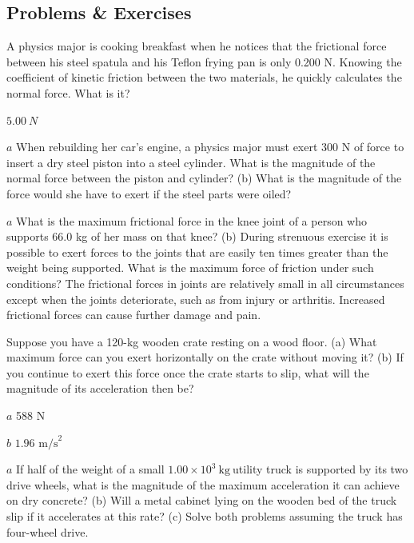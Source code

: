 \documentclass[
]{book}
\newenvironment{problems-exercises}{}{}
\begin{document}
\hypertarget{fs-id1288634}{}
\begin{problems-exercises}

\hypertarget{problems-exercises-10}{%
\subsection{Problems \& Exercises}\label{problems-exercises-10}}

\hypertarget{fs-id1462497}{}
\leavevmode\hypertarget{fs-id1462498}{}%
A physics major is cooking breakfast when he notices that the frictional
force between his steel spatula and his Teflon frying pan is only 0.200
N. Knowing the coefficient of kinetic friction between the two
materials, he quickly calculates the normal force. What is it?

\leavevmode\hypertarget{fs-id1319223}{}%
\(5.00\ N{}\)

\hypertarget{fs-id1534547}{}
\leavevmode\hypertarget{fs-id1319741}{}%
\(a\) When rebuilding her car's engine, a physics major must exert 300
N of force to insert a dry steel piston into a steel cylinder. What is
the magnitude of the normal force between the piston and cylinder? (b)
What is the magnitude of the force would she have to exert if the steel
parts were oiled?

\hypertarget{fs-id1250006}{}
\leavevmode\hypertarget{fs-id1250007}{}%
\(a\) What is the maximum frictional force in the knee joint of a person
who supports 66.0 kg of her mass on that knee? (b) During strenuous
exercise it is possible to exert forces to the joints that are easily
ten times greater than the weight being supported. What is the maximum
force of friction under such conditions? The frictional forces in joints
are relatively small in all circumstances except when the joints
deteriorate, such as from injury or arthritis. Increased frictional
forces can cause further damage and pain.

\hypertarget{fs-id1550746}{}
\leavevmode\hypertarget{fs-id1341396}{}%
Suppose you have a 120-kg wooden crate resting on a wood floor. (a) What
maximum force can you exert horizontally on the crate without moving it?
(b) If you continue to exert this force once the crate starts to slip,
what will the magnitude of its acceleration then be?

\leavevmode\hypertarget{fs-id1500174}{}%
\(a\) 588 N

\(b\) \({1\text{.}\text{96\ m}\text{/s}^{2}}{}\)

\hypertarget{fs-id1294152}{}
\leavevmode\hypertarget{fs-id1294153}{}%
\(a\) If half of the weight of a small
\({1\text{.}{\text{00} \times \text{10}^{3}}\ \text{kg}\ }{}\)utility
truck is supported by its two drive wheels, what is the magnitude of the
maximum acceleration it can achieve on dry concrete? (b) Will a metal
cabinet lying on the wooden bed of the truck slip if it accelerates at
this rate? (c) Solve both problems assuming the truck has four-wheel
drive.


\end{problems-exercises}
\end{document}
